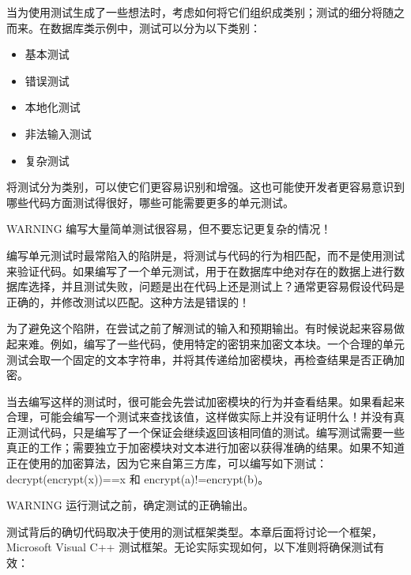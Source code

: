 当为使用测试生成了一些想法时，考虑如何将它们组织成类别；测试的细分将随之而来。在数据库类示例中，测试可以分为以下类别：

\begin{itemize}
\item
基本测试

\item
错误测试

\item
本地化测试

\item
非法输入测试

\item
复杂测试
\end{itemize}

将测试分为类别，可以使它们更容易识别和增强。这也可能使开发者更容易意识到哪些代码方面测试得很好，哪些可能需要更多的单元测试。

\begin{myWarning}{WARNING}
编写大量简单测试很容易，但不要忘记更复杂的情况！
\end{myWarning}


编写单元测试时最常陷入的陷阱是，将测试与代码的行为相匹配，而不是使用测试来验证代码。如果编写了一个单元测试，用于在数据库中绝对存在的数据上进行数据库选择，并且测试失败，问题是出在代码上还是测试上？通常更容易假设代码是正确的，并修改测试以匹配。这种方法是错误的！

为了避免这个陷阱，在尝试之前了解测试的输入和预期输出。有时候说起来容易做起来难。例如，编写了一些代码，使用特定的密钥来加密文本块。一个合理的单元测试会取一个固定的文本字符串，并将其传递给加密模块，再检查结果是否正确加密。

当去编写这样的测试时，很可能会先尝试加密模块的行为并查看结果。如果看起来合理，可能会编写一个测试来查找该值，这样做实际上并没有证明什么！并没有真正测试代码，只是编写了一个保证会继续返回该相同值的测试。编写测试需要一些真正的工作；需要独立于加密模块对文本进行加密以获得准确的结果。如果不知道正在使用的加密算法，因为它来自第三方库，可以编写如下测试：decrypt(encrypt(x))==x 和 encrypt(a)!=encrypt(b)。

\begin{myWarning}{WARNING}
运行测试之前，确定测试的正确输出。
\end{myWarning}


测试背后的确切代码取决于使用的测试框架类型。本章后面将讨论一个框架，Microsoft Visual C++ 测试框架。无论实际实现如何，以下准则将确保测试有效：

